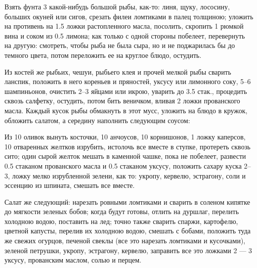 
Взять фунта 3 какой-нибудь большой рыбы, как-то: линя, щуку, лососину, больших окуней или сигов, срезать филеи ломтиками в палец толщиною; уложить на противень на 1.5 ложки растопленного масла, посолить, скропить 1 рюмкой вина и соком из 0.5 лимона; как только с одной стороны побелеет, перевернуть на другую: смотреть, чтобы рыба не была сыра, но и не поджарилась бы до темного цвета, потом переложить ее на круглое блюдо, остудить.

Из костей же рыбьих, чешуи, рыбьего клея и прочей мелкой рыбы сварить ланспик, положить в него кореньев и пряностей, уксусу или лимонного соку, 5–6 шампиньонов, очистить 2–3 яйцами или икрою, уварить до 3.5 стак., процедить сквозь салфетку, остудить, потом бить веничком, вливая 2 ложки прованского масла. Каждый кусок рыбы обмакнуть в этот мусс, уложить на блюдо в кружок, обложить салатом, а середину наполнить следующим соусом:

Из 10 оливок вынуть косточки, 10 анчоусов, 10 корнишонов, 1 ложку каперсов, 10 отваренных желтков изрубить, истолочь все вместе в ступке, протереть сквозь сито; один сырой желток мешать в каменной чашке, пока не побелеет, развести 0.5 стаканом прованского масла и 0.5 стаканом уксусу, положить сахару куска 2–3, ложку мелко изрубленной зелени, как то: укропу, кервелю, эстрагону, соли и эссенцию из шпината, смешать все вместе.

Салат же следующий: нарезать ровными ломтиками и сварить в соленом кипятке до мягкости зеленых бобов; когда будут готовы, отлить на дуршлаг, перелить холодною водою, поставить на лед; точно также сварить спаржи, картофелю, цветной капусты, перелив их холодною водою, смешать с бобами, положить туда же свежих огурцов, печеной свеклы (все это нарезать ломтиками и кусочками), зеленой петрушки, укропу, эстрагону, кервелю, заправить все это ложками 2 — 3 уксусу, прованским маслом, солью и перцем.


